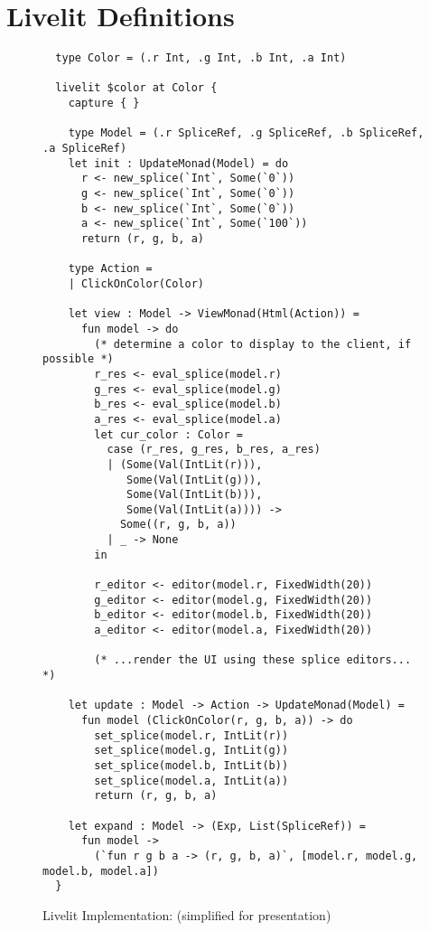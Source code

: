 \section{Livelit Definitions}\label{sec:livelit-definitions}

\begin{figure}
\begin{lstlisting}
  type Color = (.r Int, .g Int, .b Int, .a Int)

  livelit $color at Color {
    capture { }

    type Model = (.r SpliceRef, .g SpliceRef, .b SpliceRef, .a SpliceRef)
    let init : UpdateMonad(Model) = do 
      r <- new_splice(`Int`, Some(`0`))
      g <- new_splice(`Int`, Some(`0`))
      b <- new_splice(`Int`, Some(`0`))
      a <- new_splice(`Int`, Some(`100`))
      return (r, g, b, a)

    type Action = 
    | ClickOnColor(Color)
  
    let view : Model -> ViewMonad(Html(Action)) = 
      fun model -> do 
        (* determine a color to display to the client, if possible *)
        r_res <- eval_splice(model.r)
        g_res <- eval_splice(model.g)
        b_res <- eval_splice(model.b)
        a_res <- eval_splice(model.a)
        let cur_color : Color = 
          case (r_res, g_res, b_res, a_res) 
          | (Some(Val(IntLit(r))), 
             Some(Val(IntLit(g))), 
             Some(Val(IntLit(b))), 
             Some(Val(IntLit(a)))) -> 
            Some((r, g, b, a))
          | _ -> None
        in 
        
        r_editor <- editor(model.r, FixedWidth(20))
        g_editor <- editor(model.g, FixedWidth(20))
        b_editor <- editor(model.b, FixedWidth(20))
        a_editor <- editor(model.a, FixedWidth(20))
        
        (* ...render the UI using these splice editors... *)
      
    let update : Model -> Action -> UpdateMonad(Model) =
      fun model (ClickOnColor(r, g, b, a)) -> do 
        set_splice(model.r, IntLit(r))
        set_splice(model.g, IntLit(g))
        set_splice(model.b, IntLit(b))
        set_splice(model.a, IntLit(a))
        return (r, g, b, a)
    
    let expand : Model -> (Exp, List(SpliceRef)) = 
      fun model -> 
        (`fun r g b a -> (r, g, b, a)`, [model.r, model.g, model.b, model.a])
  }
\end{lstlisting}
\caption{Livelit Implementation:  (simplified for presentation)}
\label{fig:color-impl}
\end{figure}

